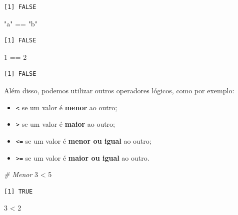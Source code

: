 \documentclass[
  brazilian,
]{book}
\newenvironment{Shaded}{\begin{snugshade}}{\end{snugshade}}
\newcommand{\CommentTok}[1]{\textcolor[rgb]{0.56,0.35,0.01}{\textit{#1}}}
\newcommand{\DecValTok}[1]{\textcolor[rgb]{0.00,0.00,0.81}{#1}}
\newcommand{\SpecialCharTok}[1]{\textcolor[rgb]{0.00,0.00,0.00}{#1}}
\newcommand{\StringTok}[1]{\textcolor[rgb]{0.31,0.60,0.02}{#1}}
\begin{document}
\begin{verbatim}
[1] FALSE
\end{verbatim}

\begin{Shaded}
\begin{Highlighting}[]
\StringTok{"a"} \SpecialCharTok{==} \StringTok{"b"}
\end{Highlighting}
\end{Shaded}

\begin{verbatim}
[1] FALSE
\end{verbatim}

\begin{Shaded}
\begin{Highlighting}[]
\DecValTok{1} \SpecialCharTok{==} \DecValTok{2}
\end{Highlighting}
\end{Shaded}

\begin{verbatim}
[1] FALSE
\end{verbatim}

Além disso, podemos utilizar outros operadores lógicos, como por exemplo:

\begin{itemize}
\item
  \texttt{\textless{}} se um valor é \textbf{menor} ao outro;
\item
  \texttt{\textgreater{}} se um valor é \textbf{maior} ao outro;
\item
  \texttt{\textless{}=} se um valor é \textbf{menor ou igual} ao outro;
\item
  \texttt{\textgreater{}=} se um valor é \textbf{maior ou igual} ao outro.
\end{itemize}

\begin{Shaded}
\begin{Highlighting}[]
\CommentTok{\# Menor}
\DecValTok{3} \SpecialCharTok{\textless{}} \DecValTok{5}
\end{Highlighting}
\end{Shaded}

\begin{verbatim}
[1] TRUE
\end{verbatim}

\begin{Shaded}
\begin{Highlighting}[]
\DecValTok{3} \SpecialCharTok{\textless{}} \DecValTok{2}
\end{Highlighting}
\end{Shaded}
\end{document}
